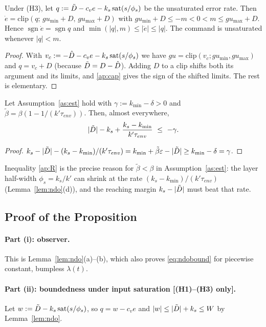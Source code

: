 \begin{lemma}\label{lem:sector}
Under (H3), let $q:=\tilde{D}-c_ve-k_s\,\mathrm{sat}(s/\phi_s)$ be the unsaturated error rate. Then $\dot e=\mathrm{clip}(q;\,gu_{\min}+D,\,gu_{\max}+D)$ with $gu_{\min}+D\le-m<0<m\le gu_{\max}+D$. Hence $\operatorname{sgn}\dot e=\operatorname{sgn}q$ and $\min(|q|,m)\le|\dot e|\le|q|$. The command is unsaturated whenever $|q|<m$.
\end{lemma}
\begin{proof}
With $v_c:=-\hat{D}-c_ve-k_s\,\mathrm{sat}(s/\phi_s)$ we have $gu=\mathrm{clip}(v_c;gu_{\min},gu_{\max})$ and $q=v_c+D$ (because $\tilde{D}=D-\hat{D}$). Adding $D$ to a clip shifts both its argument and its limits, and \eqref{ap:cap} gives the sign of the shifted limits. The rest is elementary.
\end{proof}

\begin{lemma}\label{lem:layer}
Let Assumption~\ref{as:est} hold with $\gamma:=k_{\min}-\delta>0$ and $\tilde\beta=\beta(1-1/(k'\tau_{env}))$. Then, almost everywhere,
\begin{equation}
|\Dt|-k_s+\frac{k_s-k_{\min}}{k'\tau_{env}}\ \le\ -\gamma.\label{ap:R}
\end{equation}
\end{lemma}
\begin{proof}
$k_s-|\tilde{D}|-(k_s-k_{\min})/(k'\tau_{env})=k_{\min}+\tilde\beta\varepsilon-|\tilde{D}|\ge k_{\min}-\delta=\gamma$.
\end{proof}
Inequality \eqref{ap:R} is the precise reason for $\tilde\beta<\beta$ in Assumption~\ref{as:est}: the layer half-width $\phi_s=k_s/k'$ can shrink at the rate $(k_s-k_{\min})/(k'\tau_{env})$ (Lemma~\ref{lem:ndo}(d)), and the reaching margin $k_s-|\tilde{D}|$ must beat that rate.

\subsection{Proof of the Proposition}\label{ap:proof}

\paragraph{Part (i): observer.} This is Lemma~\ref{lem:ndo}(a)--(b), which also proves \eqref{eq:ndobound} for piecewise constant, bumpless $\lambda(t)$.

\paragraph{Part (ii): boundedness under input saturation [(H1)--(H3) only].}
Let $w:=\tilde{D}-k_s\,\mathrm{sat}(s/\phi_s)$, so $q=w-c_ve$ and $|w|\le|\tilde{D}|+k_s\le W$ by Lemma~\ref{lem:ndo}.


